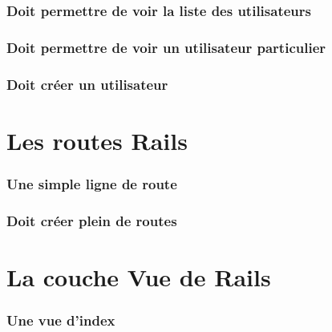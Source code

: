 \documentclass{beamer}
\begin{document}
\begin{frame}
    \frametitle{Doit permettre de voir la liste des utilisateurs}
    \begin{center}
        
    \end{center}
\end{frame}

\begin{frame}
    \frametitle{Doit permettre de voir un utilisateur particulier}
    \begin{center}
        
    \end{center}
\end{frame}

\begin{frame}
    \frametitle{Doit cr\'eer un utilisateur}
    \begin{center}
        
    \end{center}
\end{frame}

\section {Les routes Rails}

\begin{frame}
    \frametitle{Une simple ligne de route}
    \begin{center}
        
    \end{center}
\end{frame}

\begin{frame}
    \frametitle{Doit cr\'eer plein de routes}
    \begin{center}
        
    \end{center}
\end{frame}

\section {La couche Vue de Rails}

\begin{frame}
    \frametitle{Une vue d'index}
    \begin{center}
        
    \end{center}
\end{frame}
\end{document}
